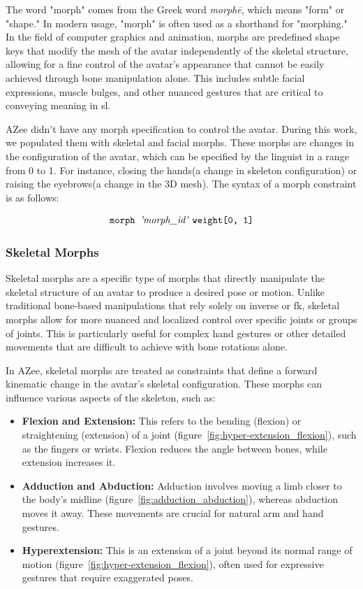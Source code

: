 \documentclass[../../main.tex]{subfiles}
\begin{document}
The word "morph" comes from the Greek word \textit{morphē}, which means "form" or "shape." In modern usage, "morph" is often used as a shorthand for "morphing." In the field of computer graphics and animation, morphs are predefined shape keys that modify the mesh of the avatar independently of the skeletal structure, allowing for a fine control of the avatar's appearance that cannot be easily achieved through bone manipulation alone. This includes subtle facial expressions, muscle bulges, and other nuanced gestures that are critical to conveying meaning in \gls{sl}.

AZee didn't have any morph specification to control the avatar. During this work, we populated them with skeletal and facial morphs. These morphs are changes in the configuration of the avatar, which can be specified by the linguist in a range from 0 to 1. For instance, closing the hands(a change in skeleton configuration) or raising the eyebrows(a change in the 3D mesh). The syntax of a morph constraint is as follows:

\[
\texttt{morph } \text{\emph{'morph\_id'}} \ \texttt{weight[0, 1]}
\]

\subsubsection{Skeletal Morphs}
\label{ch:avatar_creation_pose_synthesis:proc_rig_signing_avatars:morph_constraints:skel_morphs}

Skeletal morphs are a specific type of morphs that directly manipulate the skeletal structure of an avatar to produce a desired pose or motion. Unlike traditional bone-based manipulations that rely solely on inverse or \gls{fk}, skeletal morphs allow for more nuanced and localized control over specific joints or groups of joints. This is particularly useful for complex hand gestures or other detailed movements that are difficult to achieve with bone rotations alone.

In AZee, skeletal morphs are treated as constraints that define a forward kinematic change in the avatar's skeletal configuration. These morphs can influence various aspects of the skeleton, such as:

\begin{itemize}
    \item \textbf{Flexion and Extension:} This refers to the bending (flexion) or straightening (extension) of a joint (figure~\ref{fig:hyper-extension_flexion}), such as the fingers or wrists. Flexion reduces the angle between bones, while extension increases it.
    \item \textbf{Adduction and Abduction:} Adduction involves moving a limb closer to the body's midline (figure~\ref{fig:adduction_abduction}), whereas abduction moves it away. These movements are crucial for natural arm and hand gestures.
    \item \textbf{Hyperextension:} This is an extension of a joint beyond its normal range of motion (figure~\ref{fig:hyper-extension_flexion}), often used for expressive gestures that require exaggerated poses.
\end{itemize}
\end{document}
